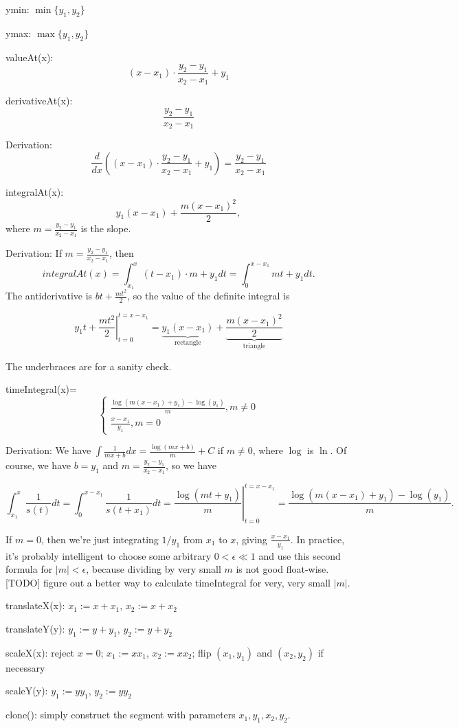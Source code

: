 \documentclass{article}
\begin{document}
ymin: $\min\{y_1, y_2\}$

ymax: $\max\{y_1, y_2\}$

valueAt(x): $$(x - x_1) \cdot \frac{y_2 - y_1}{x_2 - x_1} + y_1$$

derivativeAt(x): $$\frac{y_2-y_1}{x_2-x_1}$$

Derivation: $$\frac{d}{dx}\left((x - x_1) \cdot \frac{y_2 - y_1}{x_2 - x_1} + y_1\right) = \frac{y_2 - y_1}{x_2 - x_1}$$

integralAt(x): $$y_1(x-x_1) + \frac{m(x-x_1)^2}{2},$$ where $m=\frac{y_2 - y_1}{x_2 - x_1}$ is the slope.

Derivation: If $m=\frac{y_2 - y_1}{x_2 - x_1}$, then $$integralAt(x) = \int_{x_1}^x (t - x_1) \cdot m + y_1 dt = \int_{0}^{x-x_1} mt + y_1 dt.$$ The antiderivative is $bt + \frac{mt^2}{2}$, so the value of the definite integral is

$$\left. y_1t + \frac{mt^2}{2} \right\vert _ {t=0} ^ {t=x-x_1} = \underbrace{y_1(x-x_1)}_{\text{rectangle}} + \underbrace{\frac{m(x-x_1)^2}{2}}_{\text{triangle}}$$

The underbraces are for a sanity check.

timeIntegral(x)= $$\begin{cases}
\frac{\log(m(x-x_1)+y_1)-\log(y_1)}{m}, m\neq 0 \\
\frac{x-x_1}{y_1}, m = 0
\end{cases}$$

Derivation: We have $\int \frac{1}{mx+b} dx = \frac{\log(mx+b)}{m}+C$ if $m\neq 0$, where $\log$ is $\ln$. Of course, we have $b = y_1$ and $m=\frac{y_2 - y_1}{x_2 - x_1}$, so we have

$$\int_{x_1}^x \frac{1}{s(t)} dt = \int_{0}^{x-x_1} \frac{1}{s(t+x_1)} dt = \left. \frac{\log(mt+y_1)}{m} \right\vert _ {t=0}^{t=x-x_1} = \frac{\log(m(x-x_1)+y_1)-\log(y_1)}{m}.$$

If $m=0$, then we're just integrating $1/y_1$ from $x_1$ to $x$, giving $\frac{x-x_1}{y_1}$. In practice, it's probably intelligent to choose some arbitrary $0<\epsilon\ll 1$ and use this second formula for $|m| < \epsilon$, because dividing by very small $m$ is not good float-wise. [TODO] figure out a better way to calculate timeIntegral for very, very small $|m|$.

translateX(x): $x_1:=x+x_1$, $x_2:=x+x_2$

translateY(y): $y_1:=y+y_1$, $y_2:=y+y_2$

scaleX(x): reject $x=0$; $x_1:=xx_1$, $x_2:=xx_2$; flip $(x_1, y_1)$ and $(x_2, y_2)$ if necessary

scaleY(y): $y_1:=yy_1$, $y_2:=yy_2$

clone(): simply construct the segment with parameters $x_1, y_1, x_2, y_2$.
\end{document}
